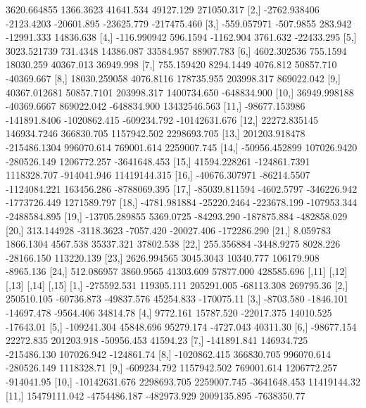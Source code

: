\documentclass[a4paper, 12pt]{article}
\begin{document}
\begin{Schunk}
\begin{Soutput}
 [1,]   3620.664855    1366.3623    41641.534    49127.129    271050.317
 [2,]  -2762.938406   -2123.4203   -20601.895   -23625.779   -217475.460
 [3,]   -559.057971    -507.9855      283.942   -12991.333     14836.638
 [4,]   -116.990942     596.1594    -1162.904     3761.632    -22433.295
 [5,]   3023.521739     731.4348    14386.087    33584.957     88907.783
 [6,]   4602.302536     755.1594    18030.259    40367.013     36949.998
 [7,]    755.159420    8294.1449     4076.812    50857.710    -40369.667
 [8,]  18030.259058    4076.8116   178735.955   203998.317    869022.042
 [9,]  40367.012681   50857.7101   203998.317  1400734.650   -648834.900
[10,]  36949.998188  -40369.6667   869022.042  -648834.900  13432546.563
[11,] -98677.153986 -141891.8406 -1020862.415  -609234.792 -10142631.676
[12,]  22272.835145  146934.7246   366830.705  1157942.502   2298693.705
[13,] 201203.918478 -215486.1304   996070.614   769001.614   2259007.745
[14,] -50956.452899  107026.9420  -280526.149  1206772.257  -3641648.453
[15,]  41594.228261 -124861.7391  1118328.707  -914041.946  11419144.315
[16,] -40676.307971  -86214.5507 -1124084.221   163456.286  -8788069.395
[17,] -85039.811594   -4602.5797  -346226.942 -1773726.449   1271589.797
[18,]  -4781.981884  -25220.2464  -223678.199  -107953.344  -2488584.895
[19,] -13705.289855    5369.0725   -84293.290  -187875.884   -482858.029
[20,]    313.144928   -3118.3623    -7057.420   -20027.406   -172286.290
[21,]      8.059783    1866.1304     4567.538    35337.321     37802.538
[22,]    255.356884   -3448.9275     8028.226   -28166.150    113220.139
[23,]   2626.994565    3045.3043    10340.777   106179.908     -8965.136
[24,]    512.086957    3860.9565    41303.609    57877.000    428585.696
              [,11]        [,12]        [,13]        [,14]       [,15]
 [1,]   -275592.531   119305.111   205291.005   -68113.308   269795.36
 [2,]    250510.105   -60736.873   -49837.576    45254.833  -170075.11
 [3,]     -8703.580    -1846.101   -14697.478    -9564.406    34814.78
 [4,]      9772.161    15787.520   -22017.375    14010.525   -17643.01
 [5,]   -109241.304    45848.696    95279.174    -4727.043    40311.30
 [6,]    -98677.154    22272.835   201203.918   -50956.453    41594.23
 [7,]   -141891.841   146934.725  -215486.130   107026.942  -124861.74
 [8,]  -1020862.415   366830.705   996070.614  -280526.149  1118328.71
 [9,]   -609234.792  1157942.502   769001.614  1206772.257  -914041.95
[10,] -10142631.676  2298693.705  2259007.745 -3641648.453 11419144.32
[11,]  15479111.042 -4754486.187  -482973.929  2009135.895 -7638350.77

\end{Soutput}
\end{Schunk}
\end{document}
